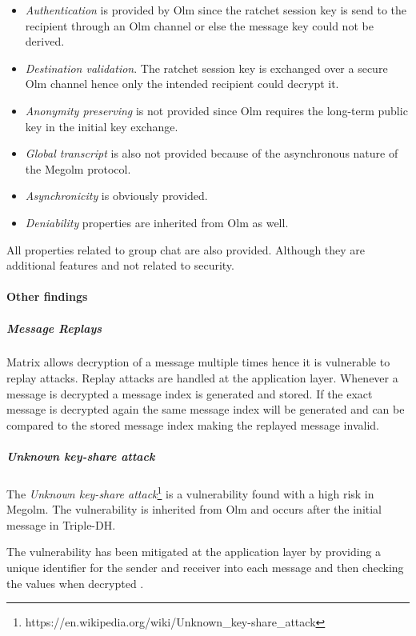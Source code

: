 \begin{itemize}
	
	\item \emph{Authentication} is provided by Olm since the ratchet session key is send to the recipient through an Olm channel or else the message key could not be derived.
	\item \emph{Destination validation}. The ratchet session key is exchanged over a secure Olm channel hence only the intended recipient could decrypt it.
	\item \emph{Anonymity preserving} is not provided since Olm requires the long-term public key in the initial key exchange.
	\item \emph{Global transcript} is also not provided because of the asynchronous nature of the Megolm protocol.  
	\item \emph{Asynchronicity} is obviously provided.
	\item \emph{Deniability} properties are inherited from Olm as well.
\end{itemize}

All properties related to group chat are also provided. Although they are additional features and not related to security. 


\paragraph{Other findings}

\subparagraph{Message Replays}

Matrix allows decryption of a message multiple times hence it is vulnerable to replay attacks. Replay attacks are handled at the application layer. Whenever a message is decrypted a message index is generated and stored. If the exact message is decrypted again the same message index will be generated and can be compared to the stored message index making the replayed message invalid. 

\subparagraph{Unknown key-share attack}

The \emph{Unknown key-share attack}\footnote{https://en.wikipedia.org/wiki/Unknown\_key-share\_attack} is a vulnerability found with a high risk in Megolm. The vulnerability is inherited from Olm and occurs after the initial message in Triple-DH. 

The vulnerability has been mitigated at the application layer by providing a unique identifier for the sender and receiver into each message and then checking the values when decrypted \cite{ncc}.

